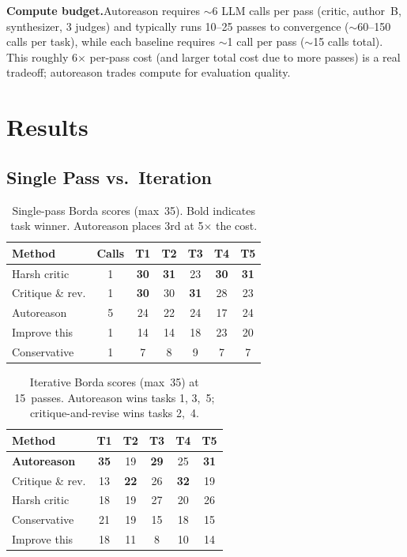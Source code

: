 \documentclass[10pt,twocolumn]{article}
\begin{document}
\textbf{Compute budget.}\enspace Autoreason requires ${\sim}$6 LLM calls per pass (critic, author~B, synthesizer, 3 judges) and typically runs 10--25 passes to convergence (${\sim}$60--150 calls per task), while each baseline requires ${\sim}$1 call per pass (${\sim}$15 calls total). This roughly 6$\times$ per-pass cost (and larger total cost due to more passes) is a real tradeoff; autoreason trades compute for evaluation quality.

\section{Results}

\subsection{Single Pass vs.\ Iteration}
\label{sec:v1}

\begin{table}[H]
\centering
\small
\begin{tabular}{@{}lcccccc@{}}
\toprule
\textbf{Method} & \textbf{Calls} & \textbf{T1} & \textbf{T2} & \textbf{T3} & \textbf{T4} & \textbf{T5} \\
\midrule
\rowcolor{TableShade}
Harsh critic & 1 & \textbf{30} & \textbf{31} & 23 & \textbf{30} & \textbf{31} \\
Critique \& rev. & 1 & \textbf{30} & 30 & \textbf{31} & 28 & 23 \\
\rowcolor{TableShade}
Autoreason & 5 & 24 & 22 & 24 & 17 & 24 \\
Improve this & 1 & 14 & 14 & 18 & 23 & 20 \\
\rowcolor{TableShade}
Conservative & 1 & 7 & 8 & 9 & 7 & 7 \\
\bottomrule
\end{tabular}
\caption{Single-pass Borda scores (max~35). Bold indicates task winner. Autoreason places 3rd at 5$\times$ the cost.}
\label{tab:v1}
\end{table}

\begin{table}[H]
\centering
\small
\begin{tabular}{@{}lccccc@{}}
\toprule
\textbf{Method} & \textbf{T1} & \textbf{T2} & \textbf{T3} & \textbf{T4} & \textbf{T5} \\
\midrule
\rowcolor{TableShade}
\textbf{Autoreason} & \textbf{35} & 19 & \textbf{29} & 25 & \textbf{31} \\
Critique \& rev. & 13 & \textbf{22} & 26 & \textbf{32} & 19 \\
\rowcolor{TableShade}
Harsh critic & 18 & 19 & 27 & 20 & 26 \\
Conservative & 21 & 19 & 15 & 18 & 15 \\
\rowcolor{TableShade}
Improve this & 18 & 11 & 8 & 10 & 14 \\
\bottomrule
\end{tabular}
\caption{Iterative Borda scores (max~35) at 15~passes. Autoreason wins tasks 1, 3,~5; critique-and-revise wins tasks 2,~4.}
\label{tab:multi}
\end{table}
\end{document}
